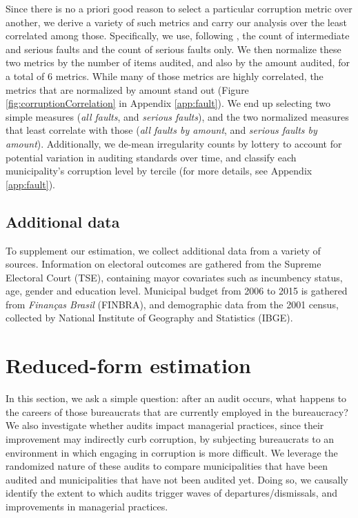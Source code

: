 Since there is no a priori good reason to select a particular corruption metric over another, we derive a variety of such metrics and carry our analysis over the least correlated among those. Specifically, we use, following \citet{avis_government_2018}, the count of intermediate and serious faults and the count of serious faults only. We then normalize these two metrics by the number of items audited, and also by the amount audited, for a total of 6 metrics. While many of those metrics are highly correlated, the metrics that are normalized by amount stand out (Figure \ref{fig:corruptionCorrelation} in Appendix \ref{app:fault}). We end up selecting two simple measures (\emph{all faults}, and \emph{serious faults}), and the two normalized measures that least correlate with those (\emph{all faults by amount}, and \emph{serious faults by amount}). Additionally, we de-mean irregularity counts by lottery to account for potential variation in auditing standards over time, and classify each municipality's corruption level by tercile (for more details, see Appendix \ref{app:fault}).

\subsection{Additional data}

To supplement our estimation, we collect additional data from a variety of sources. Information on electoral outcomes are gathered from the Supreme Electoral Court (TSE), containing mayor covariates such as incumbency status, age, gender and education level. 
Municipal budget from 2006 to 2015 is gathered from \textit{Finanças Brasil} (FINBRA), and demographic data from the 2001 census, collected by National Institute of Geography and Statistics (IBGE).

\section{Reduced-form estimation}
\label{sec:causal}

In this section, we ask a simple question: after an audit occurs, what happens to the careers of those bureaucrats that are currently employed in the bureaucracy? We also investigate whether audits impact managerial practices, since their improvement may indirectly curb corruption, by subjecting bureaucrats to an environment in which engaging in corruption is more difficult. We leverage the randomized nature of these audits to compare municipalities that have been audited and municipalities that have not been audited yet. Doing so, we causally identify the extent to which audits trigger waves of departures/dismissals, and improvements in managerial practices. 

